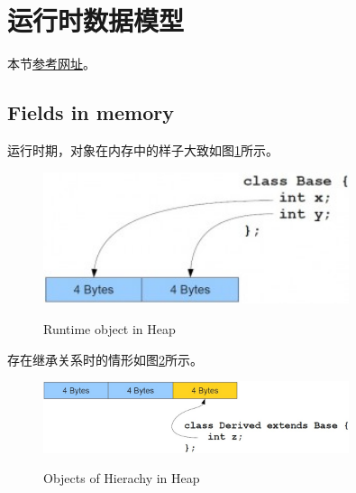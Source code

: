 \section[Rumtime object in memory]{运行时数据模型}
本节\href{http://www.programcreek.com/2011/11/what-do-java-objects-look-like-in-memory/}{参考网址}。

\subsection[Fields in memory]{Fields in memory}
运行时期，对象在内存中的样子大致如图\ref{fig:base}所示。
\begin{figure}
  \centering
  \includegraphics[width=0.8\textwidth]{picturedir/base.jpg}\\
  \caption{Runtime object in Heap}\label{fig:base}
\end{figure}

存在继承关系时的情形如图\ref{fig:derived}所示。
\begin{figure}
  \centering
  \includegraphics[width=0.8\textwidth]{picturedir/derived.jpg}\\
  \caption{Objects of Hierachy in Heap}\label{fig:derived}
\end{figure}

